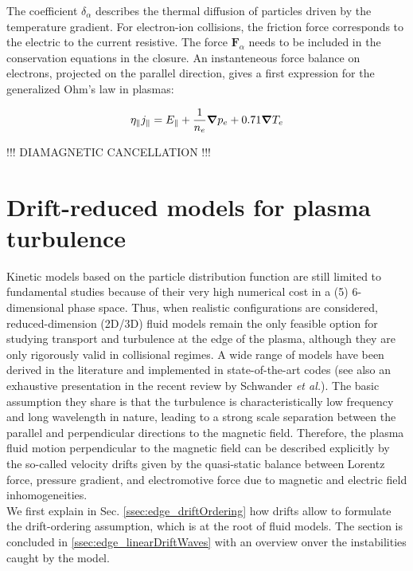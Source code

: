 The coefficient $\delta_\alpha$ describes the thermal diffusion of particles driven by the temperature gradient. For electron-ion collisions, the friction force corresponds to the electric to the current resistive. The force $\textbf{F}_\alpha$ needs to be included in the conservation equations in the closure. An instanteneous force balance on electrons, projected on the parallel direction, gives a first expression for the generalized Ohm's law in plasmas:

\begin{equation}
	\eta_\parallel j_\parallel = E_\parallel + \frac{1}{n_e}\grad p_e + 0.71\grad{T_e}
\end{equation}

!!!  DIAMAGNETIC CANCELLATION !!!



\section{Drift-reduced models for plasma turbulence}
\label{sec:edge_driftWaves}


Kinetic models based on the particle distribution function \cite{DifPradalier_2009, Charidakos_2018} are still limited to fundamental studies because of their very high numerical cost in a (5) 6-dimensional phase space. Thus, when realistic configurations are considered, reduced-dimension (2D/3D) fluid models remain the only feasible option for studying transport and turbulence at the edge of the plasma, although they are only rigorously valid in collisional regimes. A wide range of models have been derived in the literature and implemented in state-of-the-art codes \cite{DUDSON_2009, giacomin2022gbs, stegmeir2019} (see also an exhaustive presentation in the recent review by Schwander \emph{et al.}\cite{SCHWANDER_2024}). The basic assumption they share is that the turbulence is characteristically low frequency and long wavelength in nature, leading to a strong scale separation between the parallel and perpendicular directions to the magnetic field. Therefore, the plasma fluid motion perpendicular to the magnetic field can be described explicitly by the so-called velocity drifts given by the quasi-static balance between Lorentz force, pressure gradient, and electromotive force due to magnetic and electric field inhomogeneities. \\

We first explain in Sec. \ref{ssec:edge_driftOrdering} how drifts allow to formulate the drift-ordering assumption, which is at the root of fluid models. The section is concluded in \ref{ssec:edge_linearDriftWaves} with an overview onver the instabilities caught by the model. 


